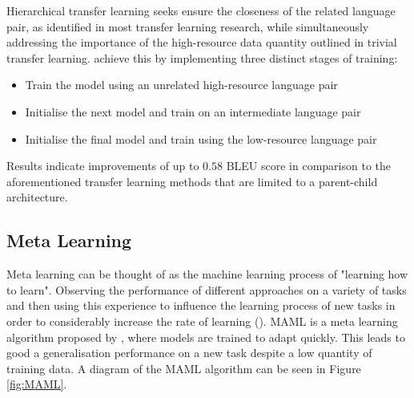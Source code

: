 Hierarchical transfer learning seeks ensure the closeness of the related language pair, as identified in most transfer learning research, while simultaneously addressing the importance of the high-resource data quantity outlined in trivial transfer learning. \cite{luo_hierarchical_2019} achieve this by implementing three distinct stages of training:

\begin{itemize}
  \item Train the model using an unrelated high-resource language pair
  \item Initialise the next model and train on an intermediate language pair
  \item Initialise the final model and train using the low-resource language pair
\end{itemize}

Results indicate improvements of up to $0.58$ \acrshort{BLEU} score in comparison to the aforementioned transfer learning methods that are limited to a parent-child architecture.




\subsection{Meta Learning}

Meta learning can be thought of as the machine learning process of "learning how to learn". Observing the performance of different approaches on a variety of tasks and then using this experience to influence the learning process of new tasks in order to considerably increase the rate of learning (\cite{vanschoren_meta-learning:_2018}).
\acrfull{MAML} is a meta learning algorithm proposed by \cite{finn_model-agnostic_2017}, where models are trained to adapt quickly. This leads to good a generalisation performance on a new task despite a low quantity of training data.
A diagram of the \acrshort{MAML} algorithm can be seen in Figure \ref{fig:MAML}.

